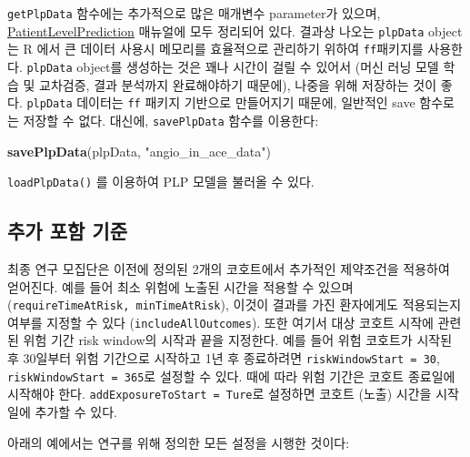 \documentclass[10.5pt]{book}
\newenvironment{Shaded}{\begin{snugshade}}{\end{snugshade}}
\newcommand{\KeywordTok}[1]{\textcolor[rgb]{0.13,0.29,0.53}{\textbf{#1}}}
\newcommand{\StringTok}[1]{\textcolor[rgb]{0.31,0.60,0.02}{#1}}
\newcommand{\NormalTok}[1]{#1}
\theoremstyle{definition}
\theoremstyle{definition}
\theoremstyle{definition}
\theoremstyle{remark}
\begin{document}
\texttt{getPlpData} 함수에는 추가적으로 많은 매개변수 parameter가
있으며,
\href{https://ohdsi.github.io/PatientLevelPrediction/}{PatientLevelPrediction}
매뉴얼에 모두 정리되어 있다. 결과상 나오는 \texttt{plpData} object는 R
에서 큰 데이터 사용시 메모리를 효율적으로 관리하기 위하여
\texttt{ff}패키지를 사용한다. \texttt{plpData} object를 생성하는 것은
꽤나 시간이 걸릴 수 있어서 (머신 러닝 모델 학습 및 교차검증, 결과
분석까지 완료해야하기 때문에), 나중을 위해 저장하는 것이 좋다.
\texttt{plpData} 데이터는 \texttt{ff} 패키지 기반으로 만들어지기 때문에,
일반적인 save 함수로는 저장할 수 없다. 대신에, \texttt{savePlpData}
함수를 이용한다:

\begin{Shaded}
\begin{Highlighting}[]
\KeywordTok{savePlpData}\NormalTok{(plpData, }\StringTok{"angio_in_ace_data"}\NormalTok{)}
\end{Highlighting}
\end{Shaded}

\texttt{loadPlpData()} 를 이용하여 PLP 모델을 불러올 수 있다.

\subsection{추가 포함 기준}\label{--}

최종 연구 모집단은 이전에 정의된 2개의 코호트에서 추가적인 제약조건을
적용하여 얻어진다. 예를 들어 최소 위험에 노출된 시간을 적용할 수 있으며
(\texttt{requireTimeAtRisk,\ minTimeAtRisk}), 이것이 결과를 가진
환자에게도 적용되는지 여부를 지정할 수 있다
(\texttt{includeAllOutcomes}). 또한 여기서 대상 코호트 시작에 관련된
위험 기간 risk window의 시작과 끝을 지정한다. 예를 들어 위험 코호트가
시작된 후 30일부터 위험 기간으로 시작하고 1년 후 종료하려면
\texttt{riskWindowStart\ =\ 30}, \texttt{riskWindowStart\ =\ 365}로
설정할 수 있다. 때에 따라 위험 기간은 코호트 종료일에 시작해야 한다.
\texttt{addExposureToStart\ =\ Ture}로 설정하면 코호트 (노출) 시간을
시작일에 추가할 수 있다.

아래의 예에서는 연구를 위해 정의한 모든 설정을 시행한 것이다:
\end{document}
